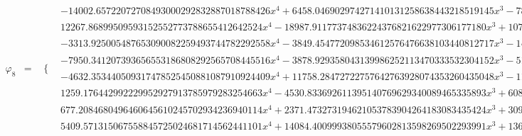 \documentclass{article}
\begin{document}
\begin{landscape}
\begin{eqnarray*}
\begin{array}{cc}
\end{array}\\
\varphi_8 & = & \begin{array}{cc}
 \{ & 
\begin{array}{cc}
 -14002.65722072708493000292832887018788426 x^4+6458.046902974271410131258638443218519145 x^3-786.6828408382968612164284185951986100337 x^2+2.840328209057239823292998828522053529211 & x\geq 0\land x<\frac{1}{4} \\
 12267.86899509593152552773788655412642524 x^4-18987.91177374836224376821622977306177180 x^3+10784.52181729506646279391822946224710773 x^2-2656.392965670126380369688424702189948673 x+238.7121397864861199778310694123573351118 & x\geq \frac{1}{4}\land x<\frac{1}{2} \\
 -3313.925005487653090082259493744782292558 x^4-3849.454772098534612576476638103440812717 x^3-1452.944399421941409556059052608619860179 x^2-183.2105162846907495957751918989823256647 x-2.180255740526007330267669165254084170721 & x\geq -\frac{1}{2}\land x<-\frac{1}{4} \\
 -7950.341207393656553186808292565708445516 x^4-3878.929358043139986252113470333532304152 x^3-518.0243113435364926048038810443237490188 x^2+2.840328209057239823292998828522053529211 & x\geq -\frac{1}{4}\land x<0 \\
 -4632.353440509317478525450881087910924409 x^4+11758.28472722757642763928074353260435048 x^3-11104.16930143961838372616665435223306421 x^2+4622.761995135228964621368112954059306370 x-715.7032213291846120602888021477281803589 & x\geq \frac{1}{2}\land x<\frac{3}{4} \\
 1259.176442992229952927913785979283254663 x^4-4530.833692611395140769629340089465335893 x^3+6086.713215640121980905263708978401720775 x^2-3617.631125414978351213294541605540452522 x+802.5751593940215581497463867373208129775 & x\geq \frac{3}{4}\land x<1 \\
 677.2084680496460645610245702934236940114 x^4+2371.473273194621053783904264183083435424 x^3+3090.533631995253567029135411317062771271 x^2+1775.481316605228230950656311258570012317 x+379.2124897549496531444005938311669824579 & x\geq -1\land x<-\frac{3}{4} \\
 5409.571315067558845725024681714562441101 x^4+14084.40099938055579602813598269502293991 x^3+13642.22515957845600065280825104642501914 x^2+5823.315374383994822063274733886887106014 x+923.8037512439029810346617844475183350635 & x\geq -\frac{3}{4}\land x<-\frac{1}{2}
\end{array}


\end{array}
\end{eqnarray*}
\end{landscape}
\end{document}
